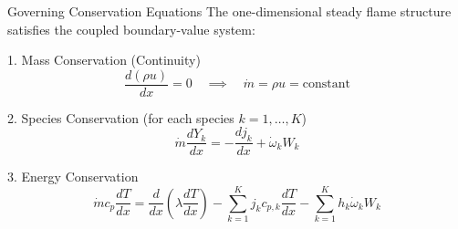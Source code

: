 \documentclass[aspectratio=169, 10pt]{beamer}
\begin{document}
\begin{frame}{Governing Conservation Equations}
The one-dimensional steady flame structure satisfies the coupled boundary-value system:

\begin{block}{1. Mass Conservation (Continuity)}
$$\frac{d(\rho u)}{dx} = 0 \quad \implies \quad \dot{m} = \rho u = \text{constant}$$
\end{block}

\begin{block}{2. Species Conservation (for each species $k = 1, \dots, K$)}
$$\dot{m} \frac{d Y_k}{dx} = -\frac{d j_k}{dx} + \dot{\omega}_k W_k$$
\end{block}

\begin{block}{3. Energy Conservation}
$$\dot{m} c_p \frac{dT}{dx} = \frac{d}{dx}\left(\lambda \frac{dT}{dx}\right) - \sum_{k=1}^K j_k c_{p,k} \frac{dT}{dx} - \sum_{k=1}^K h_k \dot{\omega}_k W_k$$
\end{block}
\end{frame}
\end{document}
